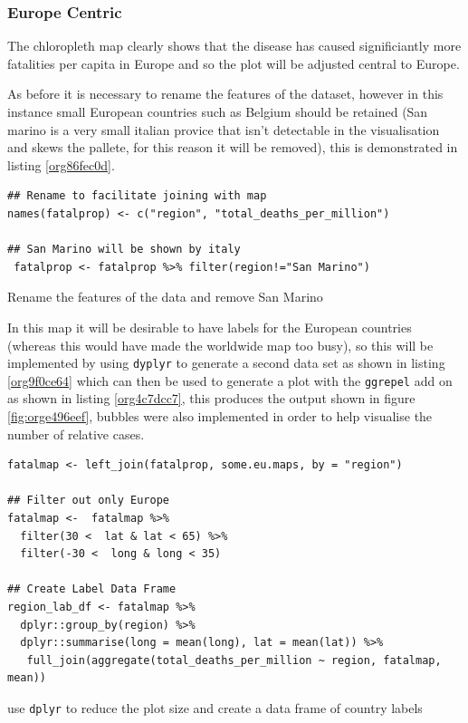 \documentclass[11pt]{article}
\begin{document}
\subsubsection{Europe Centric}
\label{sec:orgd725970}
The chloropleth map clearly shows that the disease has caused significiantly more fatalities
per capita in Europe and so the plot will be adjusted central to Europe.

As before it is necessary to rename the features of the dataset, however in this
instance small European countries such as Belgium should be retained (San marino
is a very small italian provice that isn't detectable in the visualisation and
skews the pallete, for this reason it will be removed), this is demonstrated in
listing \ref{org86fec0d}.

\begin{listing}[htbp]
\begin{verbatim}
## Rename to facilitate joining with map
names(fatalprop) <- c("region", "total_deaths_per_million")

## San Marino will be shown by italy
 fatalprop <- fatalprop %>% filter(region!="San Marino")
\end{verbatim}
\caption{\label{org86fec0d}Rename the features of the data and remove San Marino}
\end{listing}

In this map it will be desirable to have labels for the European countries
(whereas this would have made the worldwide map too busy), so this will be
implemented by using \texttt{dyplyr} to generate a second data set as shown in listing
\ref{org9f0ce64} which can then be used to generate a plot with the \texttt{ggrepel} add on as shown in listing \ref{org4c7dcc7}, this
produces the output shown in figure \ref{fig:orge496eef}, bubbles were also implemented in order to help visualise the number of relative cases.

\begin{listing}[htbp]
\begin{verbatim}
fatalmap <- left_join(fatalprop, some.eu.maps, by = "region")

## Filter out only Europe
fatalmap <-  fatalmap %>%
  filter(30 <  lat & lat < 65) %>%
  filter(-30 <  long & long < 35)

## Create Label Data Frame
region_lab_df <- fatalmap %>%
  dplyr::group_by(region) %>%
  dplyr::summarise(long = mean(long), lat = mean(lat)) %>%
   full_join(aggregate(total_deaths_per_million ~ region, fatalmap, mean))
\end{verbatim}
\caption{\label{org9f0ce64}use \texttt{dplyr} to reduce the plot size and create a data frame of country labels}
\end{listing}
\end{document}
